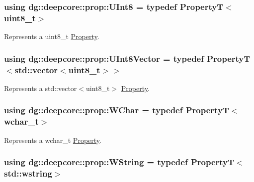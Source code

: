 \subsubsection[{\texorpdfstring{U\+Int8}{UInt8}}]{\setlength{\rightskip}{0pt plus 5cm}using {\bf dg\+::deepcore\+::prop\+::\+U\+Int8} = typedef PropertyT$<$uint8\+\_\+t$>$}\hypertarget{group___process_properties_ga00cfe1be5c63a967b6b7e7d518393d97}{}\label{group___process_properties_ga00cfe1be5c63a967b6b7e7d518393d97}


Represents a {\ttfamily uint8\+\_\+t} \hyperlink{classdg_1_1deepcore_1_1_property}{Property}. 

\subsubsection[{\texorpdfstring{U\+Int8\+Vector}{UInt8Vector}}]{\setlength{\rightskip}{0pt plus 5cm}using {\bf dg\+::deepcore\+::prop\+::\+U\+Int8\+Vector} = typedef PropertyT$<$std\+::vector$<$uint8\+\_\+t$>$$>$}\hypertarget{group___process_properties_ga07c09eb3d6ee78c35a8e4d9e846adbb6}{}\label{group___process_properties_ga07c09eb3d6ee78c35a8e4d9e846adbb6}


Represents a {\ttfamily std\+::vector$<$uint8\+\_\+t$>$} \hyperlink{classdg_1_1deepcore_1_1_property}{Property}. 

\subsubsection[{\texorpdfstring{W\+Char}{WChar}}]{\setlength{\rightskip}{0pt plus 5cm}using {\bf dg\+::deepcore\+::prop\+::\+W\+Char} = typedef PropertyT$<$wchar\+\_\+t$>$}\hypertarget{group___process_properties_ga0259b5488d3e8eb0dca8d4ff630eb90f}{}\label{group___process_properties_ga0259b5488d3e8eb0dca8d4ff630eb90f}


Represents a {\ttfamily wchar\+\_\+t} \hyperlink{classdg_1_1deepcore_1_1_property}{Property}. 

\subsubsection[{\texorpdfstring{W\+String}{WString}}]{\setlength{\rightskip}{0pt plus 5cm}using {\bf dg\+::deepcore\+::prop\+::\+W\+String} = typedef PropertyT$<$std\+::wstring$>$}\hypertarget{group___process_properties_gaf9c2048c12577553d955c02ce1247d2b}{}\label{group___process_properties_gaf9c2048c12577553d955c02ce1247d2b}


